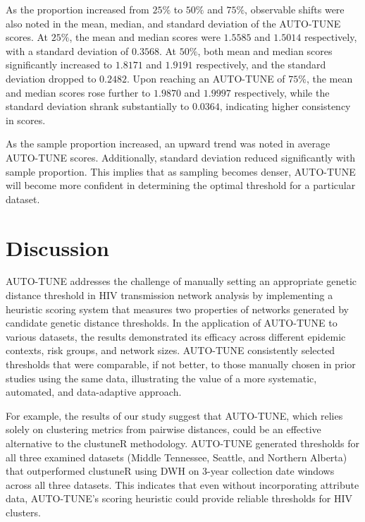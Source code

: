 \documentclass[utf8]{FrontiersinHarvard} %
\begin{document}
As the proportion increased from $25\%$ to $50\%$ and $75\%$, observable shifts
were also noted in the mean, median, and standard deviation of the AUTO-TUNE
scores. At $25\%$, the mean and median scores were $1.5585$ and $1.5014$
respectively, with a standard deviation of $0.3568$. At $50\%$, both mean and
median scores significantly increased to $1.8171$ and $1.9191$ respectively,
and the standard deviation dropped to $0.2482$. Upon reaching an AUTO-TUNE of
$75\%$, the mean and median scores rose further to $1.9870$ and $1.9997$
respectively, while the standard deviation shrank substantially to $0.0364$,
indicating higher consistency in scores.

As the sample proportion increased, an upward trend was noted in average
AUTO-TUNE scores. Additionally, standard deviation reduced significantly with
sample proportion. This implies that as sampling becomes denser, AUTO-TUNE will
become more confident in determining the optimal threshold for a particular
dataset. 


\section{Discussion}

AUTO-TUNE addresses the challenge of manually setting an appropriate genetic
distance threshold in HIV transmission network analysis by implementing a
heuristic scoring system that measures two properties of networks generated by
candidate genetic distance thresholds. In the application of AUTO-TUNE to
various datasets, the results demonstrated its efficacy across different
epidemic contexts, risk groups, and network sizes. AUTO-TUNE consistently
selected thresholds that were comparable, if not better, to those manually
chosen in prior studies using the same data, illustrating the value of a more
systematic, automated, and data-adaptive approach.

For example, the results of our study suggest that AUTO-TUNE, which relies
solely on clustering metrics from pairwise distances, could be an effective
alternative to the clustuneR methodology. AUTO-TUNE generated thresholds for
all three examined datasets (Middle Tennessee, Seattle, and Northern Alberta)
that outperformed clustuneR using DWH on 3-year collection date windows across
all three datasets. This indicates that even without incorporating attribute
data, AUTO-TUNE's scoring heuristic could provide reliable thresholds for HIV
clusters.
\end{document}
